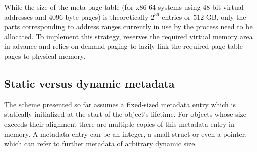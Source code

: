 While the size of the meta-page table (for x86-64 systems using 48-bit virtual addresses and 4096-byte pages)
is theoretically $2^{36}$ entries or $512$ GB, only the parts corresponding to address ranges currently in use by the process need to be allocated. To implement this strategy, \projectname{} reserves the required virtual memory area in advance and relies on demand paging to lazily link the required page table pages to physical memory.

\subsection{Static versus dynamic metadata}
\label{sec:metadata}

The scheme presented so far assumes a fixed-sized metadata entry
which is statically initialized at the start of the object's lifetime.
For objects whose size exceeds their alignment there are multiple copies
of this metadata entry in memory.
A metadata entry can be an integer, a small struct
or even a pointer, which can refer to further metadata of arbitrary dynamic size.


